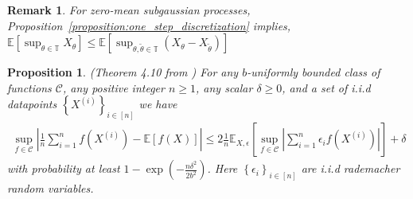 \documentclass[letterpaper]{article}
\newtheorem{remark}{Remark}
\newtheorem{proposition}[theorem]{Proposition}
\newcommand{\bas}[1]{\begin{align*}#1\end{align*}}
\newcommand{\E}{\mathbb{E}}
\newcommand{\bb}[1]{\left(#1\right)}
\newcommand{\bbb}[1]{\left[#1\right]}
\begin{document}
\begin{remark}
    \label{remark:subgaussian_suprema}
    For zero-mean subgaussian processes, Proposition~\ref{proposition:one_step_discretization} implies, $\E\bbb{\sup_{\theta \in \mathbb{T}}X_{\theta}} \leq \E\bbb{\sup_{\theta, \tilde{\theta} \in \mathbb{T}}\bb{X_{\theta}-X_{\tilde{\theta}}}}$
\end{remark}

\begin{proposition} \label{proposition:rademacher_complexity_bound} (Theorem 4.10 from \cite{wainwright2019high}) For any $b$-uniformly bounded class of functions $\mathcal{C}$, any positive integer $n \geq 1$, any scalar $\delta \geq 0$, and a set of i.i.d datapoints $\left\{X^{\bb{i}}\right\}_{i \in [n]}$ we have
\bas{
    \sup_{f \in \mathcal{C}}\left|\frac{1}{n}\sum_{i=1}^{n}f\bb{X^{\bb{i}}} - \E\bbb{f\bb{X}}\right|  \leq 2\frac{1}{n}\E_{X,\epsilon}\bbb{\sup_{f \in \mathcal{C}}\left|\sum_{i=1}^{n}\epsilon_{i}f\bb{X^{\bb{i}}}\right|} + \delta 
}
with probability at least $1 - \exp\bb{-\frac{n\delta^{2}}{2b^{2}}}$. Here $\left\{\epsilon_{i}\right\}_{i \in [n]}$ are i.i.d rademacher random variables.
\end{proposition}
\end{document}
